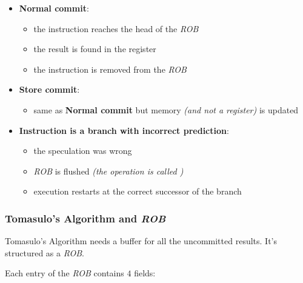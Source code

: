\documentclass[english]{article}
\begin{document}
\begin{itemize}
  \item \textbf{Normal commit}:
        \begin{itemize}
          \item the instruction reaches the head of the \textit{ROB}
          \item the result is found in the register
          \item the instruction is removed from the \textit{ROB}
        \end{itemize}
  \item \textbf{Store commit}:
        \begin{itemize}
          \item same as \textbf{Normal commit} but memory \textit{(and not a register)} is updated
        \end{itemize}
  \item \textbf{Instruction is a branch with incorrect prediction}:
        \begin{itemize}
          \item the speculation was wrong
          \item \textit{ROB} is flushed \textit{(the operation is called )}
          \item execution restarts at the correct successor of the branch
        \end{itemize}
\end{itemize}

\subsubsection{Tomasulo's Algorithm and \textit{ROB}}

Tomasulo's Algorithm needs a buffer for all the uncommitted results.
It's structured as a \textit{ROB}.

Each entry of the \textit{ROB} contains \(4\) fields:
\end{document}
